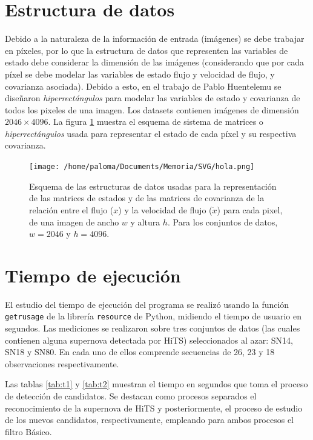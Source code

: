 \section{Estructura de datos}
\label{des:struct}
Debido a la naturaleza de la informaci\'on de entrada (im\'agenes) se debe trabajar en p\'ixeles, por lo que la estructura de datos que representen las variables de estado debe considerar la dimensi\'on de las im\'agenes (considerando que por cada p\'ixel se debe modelar las variables de estado flujo y velocidad de flujo, y covarianza asociada). Debido a esto, en el trabajo de Pablo Huentelemu \cite{huentelemu} se dise\~naron \textit{hiperrect\'angulos} para modelar las variables de estado y covarianza de todos los pixeles de una imagen. Los datasets contienen im\'agenes de dimensi\'on  $2046 \times 4096$. La figura \ref{fig:data_scheme} muestra el esquema de sistema de matrices o \textit{hiperrect\'angulos} usada para representar el estado de cada p\'ixel y su respectiva covarianza.
\bigskip  

\begin{figure}
\centering
\texttt{[image: /home/paloma/Documents/Memoria/SVG/hola.png]}
\caption{Esquema de las estructuras de datos usadas para la representaci\'on de las matrices de estados y de las matrices de covarianza de la relaci\'on entre el flujo ($x$) y la velocidad de flujo ($\dot{x}$) para cada pixel, de una imagen de ancho $w$ y altura $h$. Para los conjuntos de datos, $w=2046$ y $h=4096$.}
\label{fig:data_scheme}
\end{figure}
\bigskip

\section{Tiempo de ejecuci\'on}

El estudio del tiempo de ejecuci\'on del programa se realiz\'o usando la funci\'on \texttt{getrusage} de la librer\'ia \texttt{resource} de Python, midiendo el tiempo de usuario en segundos. Las mediciones se realizaron sobre tres conjuntos de datos (las cuales contienen alguna supernova detectada por HiTS) seleccionados al azar: SN14, SN18 y  SN80. En cada uno de ellos comprende secuencias de 26, 23 y 18 observaciones respectivamente. 
\bigskip

Las tablas \ref{tab:t1} y \ref{tab:t2} muestran el tiempo en segundos que toma el proceso de detecci\'on de candidatos. Se destacan como procesos separados el reconocimiento de la supernova de HiTS y posteriormente, el proceso de estudio de los nuevos candidatos, respectivamente, empleando para ambos procesos el filtro B\'asico.  

